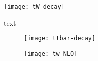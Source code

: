 \begin{figure}[htbp]
	\centering
	\texttt{[image: tW-decay]}
	\caption{text}
	\label{fig:tw-decay}
\end{figure}

\begin{figure}[htbp]
    \centering
    \begin{subfigure}[b]{0.44\textwidth}
        \texttt{[image: ttbar-decay]}
        \caption{}
        \label{fig:nlo:ttbar}
    \end{subfigure}
\quad
    \begin{subfigure}[b]{0.44\textwidth}
        \texttt{[image: tw-NLO]}
        \caption{}
        \label{fig:nlo:tw}
    \end{subfigure}
    \caption{}
	\label{fig:nlo}
\end{figure}
